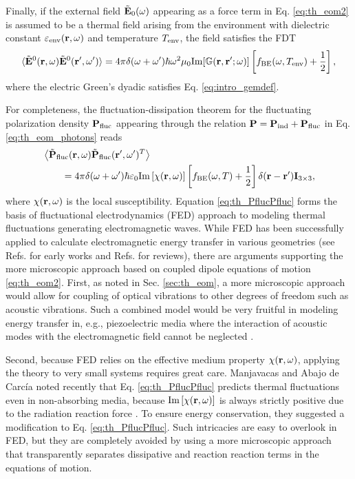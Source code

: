 Finally, if the external field $\tilde{\mathbf{E}}_0(\omega)$ appearing as a force term in Eq. \eqref{eq:th_eom2} is assumed to be a thermal field arising from the environment with dielectric constant $\varepsilon_{\textrm{env}}(\mathbf{r},\omega)$ and temperature $T_{\textrm{env}}$, the field satisfies the FDT \cite{novotny}
\begin{equation}
 \langle \tilde {\mathbf{E}}^0(\mathbf{r},\omega) \tilde {\mathbf{E}}^0(\mathbf{r}',\omega') \rangle = 4\pi \delta(\omega+\omega') \hbar \omega^2 \mu_0 \textrm{Im}[\mathbb{G}(\mathbf{r},\mathbf{r}';\omega)] \left[f_{\textrm{BE}}(\omega,T_{\textrm{env}})+ \frac{1}{2} \right],
\end{equation}
where the electric Green's dyadic satisfies Eq. \eqref{eq:intro_gemdef}.

For completeness, the fluctuation-dissipation theorem for the fluctuating polarization density $\mathbf{P}_{\textrm{fluc}}$ appearing through the relation $\mathbf{P}=\mathbf{P}_{\textrm{ind}}+\mathbf{P}_{\textrm{fluc}}$ in Eq. \eqref{eq:th_eom_photons} reads \cite{novotny}
\begin{alignat}{2}
 & \left\langle \tilde{\mathbf{P}}_{\textrm{fluc}}(\mathbf{r},\omega) \tilde{\mathbf{P}}_{\textrm{fluc}}(\mathbf{r}',\omega')^T\right\rangle \notag \\
 &\qquad = 4\pi \delta(\omega+\omega') \hbar \varepsilon_0 \textrm{Im}\left[ \chi(\mathbf{r},\omega)\right] \left[f_{\textrm{BE}}(\omega,T)+\frac{1}{2}\right] \delta(\mathbf{r}-\mathbf{r}') \mathbf{I}_{3 \times 3}, \label{eq:th_PflucPfluc}
\end{alignat}
where $\chi(\mathbf{r},\omega)$ is the local susceptibility. Equation \eqref{eq:th_PflucPfluc} forms the basis of fluctuational electrodynamics \cite{rytov,lifshitz55} (FED) approach to modeling thermal fluctuations generating electromagnetic waves. While FED has been successfully applied to calculate electromagnetic energy transfer in various geometries (see Refs. \cite{polder71,loomis94,pendry99,volokitin01} for early works and Refs. \cite{joulain05,volokitin07} for reviews), there are arguments supporting the more microscopic approach based on coupled dipole equations of motion \eqref{eq:th_eom2}. First, as noted in Sec. \ref{sec:th_eom}, a more microscopic approach would allow for coupling of optical vibrations to other degrees of freedom such as acoustic vibrations. Such a combined model would be very fruitful in modeling energy transfer in, e.g., piezoelectric media where the interaction of acoustic modes with the electromagnetic field cannot be neglected \cite{prunnila10}. 

Second, because FED relies on the effective medium property $\chi(\mathbf{r},\omega)$, applying the theory to very small systems requires great care. Manjavacas and Abajo de Carc\'ia \cite{manjavacas12} noted recently that Eq. \eqref{eq:th_PflucPfluc} predicts thermal fluctuations even in non-absorbing media, because $\textrm{Im}\left[ \chi(\mathbf{r},\omega)\right]$ is always strictly positive due to the radiation reaction force \cite{jackson}. To ensure energy conservation, they suggested a modification to Eq. \eqref{eq:th_PflucPfluc}. Such intricacies are easy to overlook in FED, but they are completely avoided by using a more microscopic approach that transparently separates dissipative and reaction reaction terms in the equations of motion.


